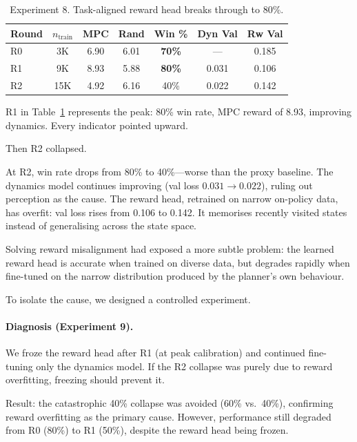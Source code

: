 \documentclass{article}
\begin{document}
\begin{table}[H]
\centering
\caption{Experiment 8. Task-aligned reward head breaks through to 80\%.}
\label{tab:exp8}
\begin{tabular}{lcccccc}
\toprule
\textbf{Round} & $n_{\text{train}}$ & \textbf{MPC} & \textbf{Rand} & \textbf{Win \%} & \textbf{Dyn Val} & \textbf{Rw Val} \\
\midrule
R0 & 3K & 6.90 & 6.01 & \textbf{70\%} & --- & 0.185 \\
\rowcolor{green!8} R1 & 9K & 8.93 & 5.88 & \textbf{80\%} & 0.031 & 0.106 \\
\rowcolor{red!8} R2 & 15K & 4.92 & 6.16 & 40\% & 0.022 & 0.142 \\
\bottomrule
\end{tabular}
\end{table}

R1 in Table~\ref{tab:exp8} represents the peak: 80\% win rate, MPC reward of 8.93, improving dynamics. Every indicator pointed upward.

Then R2 collapsed.

\begin{failurebox}
\small At R2, win rate drops from 80\% to 40\%---worse than the proxy baseline. The dynamics model continues improving (val loss $0.031 \rightarrow 0.022$), ruling out perception as the cause. The reward head, retrained on narrow on-policy data, has overfit: val loss rises from 0.106 to 0.142. It memorises recently visited states instead of generalising across the state space.
\end{failurebox}

\noindent Solving reward misalignment had exposed a more subtle problem: the learned reward head is accurate when trained on diverse data, but degrades rapidly when fine-tuned on the narrow distribution produced by the planner's own behaviour.

To isolate the cause, we designed a controlled experiment.

\paragraph{Diagnosis (Experiment 9).}
We froze the reward head after R1 (at peak calibration) and continued fine-tuning only the dynamics model. If the R2 collapse was purely due to reward overfitting, freezing should prevent it.

Result: the catastrophic 40\% collapse was avoided (60\% vs.\ 40\%), confirming reward overfitting as the primary cause. However, performance still degraded from R0 (80\%) to R1 (50\%), despite the reward head being frozen.
\end{document}
